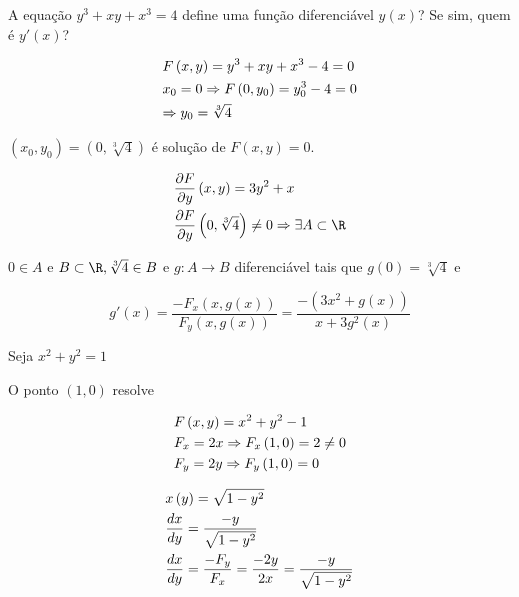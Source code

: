 \documentclass[11pt, oneside, a4paper]{gsm-l}
\begin{document}
\begin{exem}
    A equação $y^3  + xy + x^3  = 4$ define uma função diferenciável $y(x)$? Se sim, quem é $y'(x)$?
\end{exem}

\begin{sol}
\[
\begin{gathered}
F\left( {x,y} \right) = y^3  + xy + x^3  - 4 = 0 \hfill \\
x_0  = 0 \Rightarrow F\left( {0,y_0 } \right) = y_0^3  - 4 = 0 \hfill \\
\Rightarrow y_0  = \sqrt[3]{4} \hfill \\
\end{gathered}
\]

$\left( {x_0 ,y_0 } \right) = \left( {0,\sqrt[3]{4}} \right)$ é solução de $F\left( {x,y} \right) = 0$.

\[
\begin{gathered}
\frac{{\partial F}}
{{\partial y}}\left( {x,y} \right) = 3y^2  + x \hfill \\
\frac{{\partial F}}
{{\partial y}}\left( {0,\sqrt[3]{4}} \right) \ne 0 \Rightarrow \exists A \subset \R \hfill \\
\end{gathered}
\]

$0 \in A$ e $B \subset \R,\sqrt[3]{4} \in B$ e $g:A \to B$ diferenciável tais que $g\left( 0 \right) = \sqrt[3]{4}$ e

\[
g'\left( x \right) = \frac{{ - F_x \left( {x,g\left( x \right)} \right)}}
{{F_y \left( {x,g\left( x \right)} \right)}} = \frac{{ - \left( {3x^2  + g\left( x \right)} \right)}}
{{x + 3g^2 \left( x \right)}}
\]

\end{sol}

\begin{exem}
Seja $x^2  + y^2  = 1$
\end{exem}

\begin{sol}
O ponto $(1,0)$ resolve

\[
\begin{gathered}
F\left( {x,y} \right) = x^2  + y^2  - 1 \hfill \\
F_x  = 2x \Rightarrow F_x \left( {1,0} \right) = 2 \ne 0 \hfill \\
F_y  = 2y \Rightarrow F_y \left( {1,0} \right) = 0 \hfill \\
\end{gathered}
\]


\[
\begin{gathered}
x\left( y \right) = \sqrt {1 - y^2 }  \hfill \\
\frac{{dx}}
{{dy}} = \frac{{ - y}}
{{\sqrt {1 - y^2 } }} \hfill \\
\frac{{dx}}
{{dy}} = \frac{{ - F_y }}
{{F_x }} = \frac{{ - 2y}}
{{2x}} = \frac{{ - y}}
{{\sqrt {1 - y^2 } }} \hfill \\
\end{gathered}
\]

\end{sol}
\end{document}
